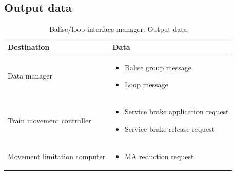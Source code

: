 \documentclass[nocc]{template/openetcs_report}
\begin{document}
\subsection{Output data}
			\begin{longtable}{|l|l|}
				\caption{Balise/loop interface manager: Output data}\\ 
				\hline
				
					\begin{minipage}[t]{0.35\linewidth} \textbf{Destination}	\end{minipage} 
				&	\begin{minipage}[t]{0.65\linewidth} \textbf{Data} \end{minipage} \\
				
				\hline
																																									
					\begin{minipage}[t]{0.35\linewidth} Data manager	\end{minipage} 
				&	\begin{minipage}[t]{0.65\linewidth}
						\begin{itemize}
							\item Balise group message
							\item Loop message						
						\end{itemize}
					\end{minipage} \\
				
				\hline
				
					\begin{minipage}[t]{0.35\linewidth} Train movement controller	\end{minipage} 
				&	\begin{minipage}[t]{0.65\linewidth}
						\begin{itemize}
							\item Service brake application request
							\item Service brake release request
						\end{itemize}			
					\end{minipage} \\
				
				\hline
					
					\begin{minipage}[t]{0.35\linewidth} Movement limitation computer	\end{minipage} 
				&	\begin{minipage}[t]{0.65\linewidth}
						\begin{itemize}
							\item MA reduction request
						\end{itemize}			
					\end{minipage} \\
				

\end{longtable}
\end{document}
